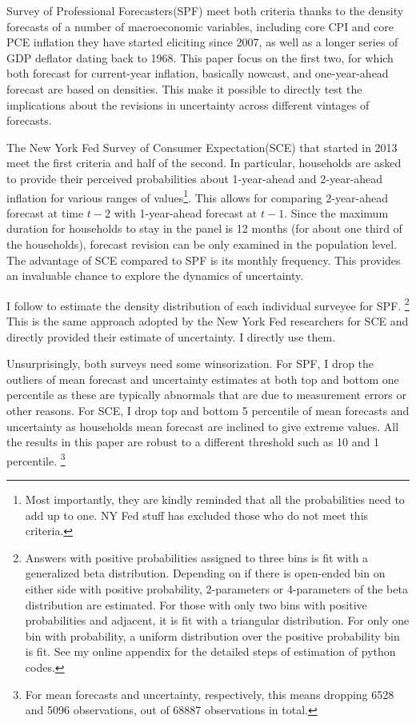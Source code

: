 \documentclass[12pt]{article}
\begin{document}
	Survey of Professional Forecasters(SPF) meet both criteria thanks to the density forecasts of a number of macroeconomic variables, including core CPI and core PCE inflation they have started eliciting since 2007, as well as a longer series of GDP deflator dating back to 1968. This paper focus on the first two, for which both forecast for current-year inflation, basically nowcast, and one-year-ahead forecast are based on densities. This make it possible to directly test the implications about the revisions in uncertainty across different vintages of forecasts.   
	
	The New York Fed Survey of Consumer Expectation(SCE) that started in 2013 meet the first criteria and half of the second. In particular, households are asked to provide their perceived probabilities about 1-year-ahead and 2-year-ahead inflation for various ranges of values\footnote{Most importantly, they are kindly reminded that all the probabilities need to add up to one. NY Fed stuff has excluded those who do not meet this criteria.}. This allows for comparing 2-year-ahead forecast at time $t-2$ with 1-year-ahead forecast at $t-1$. Since the maximum duration for households to stay in the panel is 12 months (for about one third of the households),  forecast revision can be only examined in the population level. The advantage of SCE compared to SPF is its monthly frequency. This provides an invaluable chance to explore the dynamics of uncertainty. 
	
	I follow \citet{engelberg2009comparing} to estimate the density distribution of each individual surveyee for SPF. \footnote{Answers with positive probabilities assigned to three bins is fit with a generalized beta distribution. Depending on if there is open-ended bin on either side with positive probability, 2-parameters or 4-parameters of the beta distribution are estimated. For those with only two bins with positive probabilities and adjacent, it is fit with a triangular distribution. For only one bin with probability, a uniform distribution over the positive probability bin is fit. See my online appendix for the detailed steps of estimation of python codes.} This is the same approach adopted by the New York Fed researchers \citet{armantier2017overview} for SCE and directly provided their estimate of uncertainty. I directly use them. 
	
	Unsurprisingly, both surveys need some winsorization. For SPF, I drop the outliers of mean forecast and uncertainty estimates at both top and bottom one percentile as these are typically abnormals that are due to measurement errors or other reasons.   For SCE, I drop top and bottom 5 percentile of mean forecasts and uncertainty as households mean forecast are inclined to give extreme values. All the results in this paper are robust to a different threshold such as 10 and 1 percentile. \footnote{For mean forecasts and uncertainty, respectively, this means dropping 6528 and 5096 observations, out of 68887 observations in total.}
	
\end{document}
